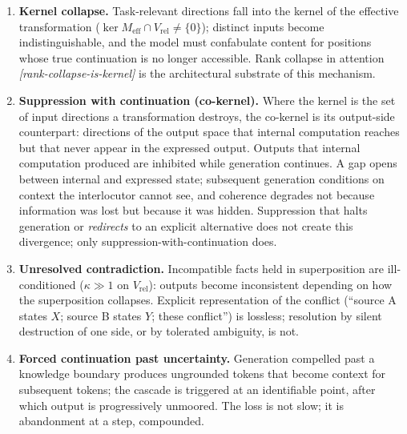 \documentclass[11pt]{article}
\theoremstyle{remark}
\newif\ifslugs \slugstrue  %
\newcommand{\slug}[1]{\ifslugs\,{\small\textit{[#1]}}\fi}
\newcommand{\Vrel}{V_{\mathrm{rel}}}
\newcommand{\Meff}{M_{\mathrm{eff}}}
\begin{document}
\begin{enumerate}
\item \textbf{Kernel collapse.} Task-relevant directions fall into the kernel of the
effective transformation ($\ker \Meff \cap \Vrel \neq \{0\}$); distinct inputs become
indistinguishable, and the model must confabulate content for positions whose true
continuation is no longer accessible. Rank collapse in attention
\citep{dong2021attention}\slug{rank-collapse-is-kernel} is the architectural substrate of this mechanism.
\item \textbf{Suppression with continuation (co-kernel).} Where the kernel is
the set of input directions a transformation destroys, the co-kernel is its
output-side counterpart: directions of the output space that internal
computation reaches but that never appear in the expressed output. Outputs
that internal computation produced are inhibited while generation continues. A gap opens between
internal and expressed state; subsequent generation conditions on context the
interlocutor cannot see, and coherence degrades not because information was lost but
because it was hidden. Suppression that halts generation or \emph{redirects} to an
explicit alternative does not create this divergence; only
suppression-with-continuation does.
\item \textbf{Unresolved contradiction.} Incompatible facts held in superposition are
ill-conditioned ($\kappa \gg 1$ on $\Vrel$): outputs become inconsistent depending on
how the superposition collapses. Explicit representation of the conflict (``source A
states $X$; source B states $Y$; these conflict'') is lossless; resolution by
silent destruction of one side, or by tolerated ambiguity, is not.
\item \textbf{Forced continuation past uncertainty.} Generation compelled past a
knowledge boundary produces ungrounded tokens that become context for subsequent
tokens; the cascade is triggered at an identifiable point, after which output is
progressively unmoored. The loss is not slow; it is abandonment at a step, compounded.
\end{enumerate}
\end{document}
